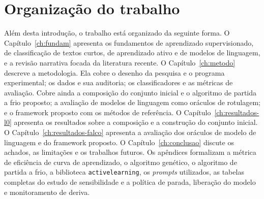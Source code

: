 \section{Organização do trabalho}
\label{sec:intro-organizacao}

Além desta introdução, o trabalho está organizado da seguinte forma. O
Capítulo~\ref{ch:fundam} apresenta os fundamentos de aprendizado
supervisionado, de classificação de textos curtos, de aprendizado ativo e de
modelos de linguagem, e a revisão narrativa focada da literatura recente. O
Capítulo~\ref{ch:metodo} descreve a metodologia. Ela cobre o desenho da pesquisa e
o programa experimental; os dados e sua auditoria; os classificadores e as
métricas de avaliação. Cobre ainda a composição do conjunto inicial e o
algoritmo de partida a frio proposto; a avaliação de modelos de linguagem como
oráculos de rotulagem; e o framework proposto com os métodos de referência. O
Capítulo~\ref{ch:resultados-l0} apresenta os resultados sobre a composição e a
construção do conjunto inicial. O Capítulo~\ref{ch:resultados-falco} apresenta
a avaliação dos oráculos de modelo de linguagem e do framework proposto. O
Capítulo~\ref{ch:conclusao} discute os achados, as limitações e os trabalhos
futuros. Os apêndices formalizam a métrica de eficiência de curva de
aprendizado, o algoritmo genético, o algoritmo de partida a frio, a biblioteca
\texttt{activelearning}, os \textit{prompts} utilizados, as tabelas completas
do estudo de sensibilidade e a política de parada, liberação do modelo e
monitoramento de deriva.
